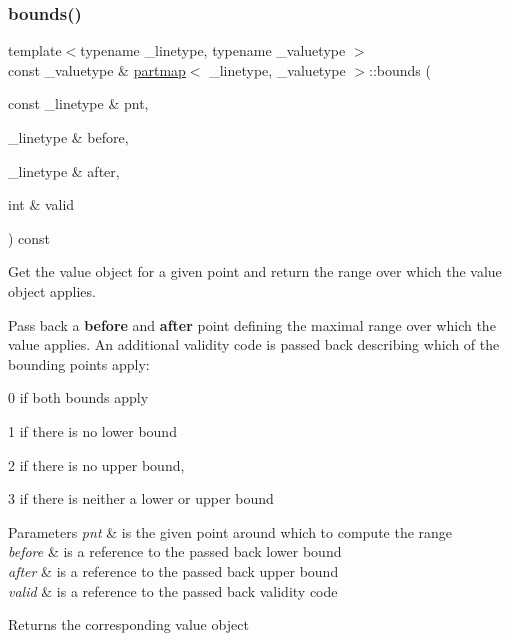 \mbox{\label{classpartmap_ac0e5535fb352dd1bd1d85971cdac1d9f}} 
\subsubsection{\texorpdfstring{bounds()}{bounds()}}
{\footnotesize\ttfamily template$<$typename \+\_\+linetype, typename \+\_\+valuetype $>$ \\
const \+\_\+valuetype \& \mbox{\hyperlink{classpartmap}{partmap}}$<$ \+\_\+linetype, \+\_\+valuetype $>$\+::bounds (\begin{DoxyParamCaption}\item[{const \+\_\+linetype \&}]{pnt,  }\item[{\+\_\+linetype \&}]{before,  }\item[{\+\_\+linetype \&}]{after,  }\item[{int \&}]{valid }\end{DoxyParamCaption}) const}



Get the value object for a given point and return the range over which the value object applies. 

Pass back a {\bfseries{before}} and {\bfseries{after}} point defining the maximal range over which the value applies. An additional validity code is passed back describing which of the bounding points apply\+:
\begin{DoxyItemize}
\item 0 if both bounds apply
\item 1 if there is no lower bound
\item 2 if there is no upper bound,
\item 3 if there is neither a lower or upper bound 
\begin{DoxyParams}{Parameters}
{\em pnt} & is the given point around which to compute the range \\
\hline
{\em before} & is a reference to the passed back lower bound \\
\hline
{\em after} & is a reference to the passed back upper bound \\
\hline
{\em valid} & is a reference to the passed back validity code \\
\hline
\end{DoxyParams}
\begin{DoxyReturn}{Returns}
the corresponding value object 
\end{DoxyReturn}

\end{DoxyItemize}

